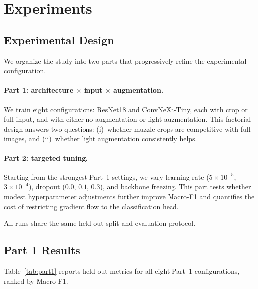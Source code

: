 \documentclass[sigconf]{acmart}
\begin{document}
\section{Experiments}
\label{sec:experiments}

\subsection{Experimental Design}

We organize the study into two parts that progressively refine the
experimental configuration.

\paragraph{Part 1: architecture $\times$ input $\times$ augmentation.}
We train eight configurations: ResNet18 and ConvNeXt-Tiny, each with crop or
full input, and with either no augmentation or light augmentation. This
factorial design answers two questions: (i)~whether muzzle crops are
competitive with full images, and (ii)~whether light augmentation consistently
helps.

\paragraph{Part 2: targeted tuning.}
Starting from the strongest Part~1 settings, we vary learning rate
($5\times10^{-5}$, $3\times10^{-4}$), dropout ($0.0$, $0.1$, $0.3$), and
backbone freezing. This part tests whether modest hyperparameter adjustments
further improve Macro-F1 and quantifies the cost of restricting gradient flow
to the classification head.

All runs share the same held-out split and evaluation protocol.

\subsection{Part 1 Results}

Table~\ref{tab:part1} reports held-out metrics for all eight Part~1
configurations, ranked by Macro-F1.
\end{document}
